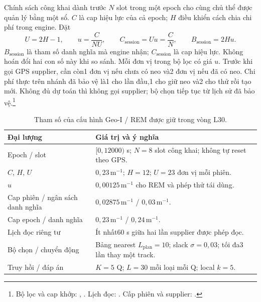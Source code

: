Chính sách công khai dành trước $N$ slot trong một epoch cho cùng chủ thể được quản lý bằng một sổ. $C$ là cap hiệu lực của cả epoch; $H$ điều khiển cách chia chi phí trong engine. Đặt
\begin{equation}
 U=2H-1,\qquad u=\frac{C}{N U},\qquad
 C_{\mathrm{session}}=Uu=\frac{C}{N},\qquad
 B_{\mathrm{session}}=2Hu.
 \label{eq:current-budget}
\end{equation}
$B_{\mathrm{session}}$ là tham số danh nghĩa mà engine nhận; $C_{\mathrm{session}}$ là cap hiệu lực. Không hoán đổi hai con số này khi so sánh. Mỗi đơn vị trong bộ lọc có giá $u$. Trước khi gọi GPS supplier, cần còn1 đơn vị nếu chưa có neo và2 đơn vị nếu đã có neo. Chi phí thực trên nhánh đã bảo vệ là1 cho lần đầu,1 cho giữ neo và2 cho thử rồi tạo mới. Không đủ dự toán thì không gọi supplier; bộ chọn tiếp tục từ lịch sử đã bảo vệ.\footnote{Bộ lọc và cap khớp: , . Lịch đọc: . Cấp phiên và supplier: .}

\begin{table}[htbp]\centering\small
\caption{Tham số của cấu hình Geo-I / REM được giữ trong vòng L30.}
\label{tab:current-method-config}
\begin{tabularx}{\textwidth}{P{4.6cm}Y}\toprule
Đại lượng & Giá trị và ý nghĩa\\\midrule
Epoch / slot & $[0,12000)$ s; $N=8$ slot công khai; không tự reset theo GPS.\\
$C$, $H$, $U$ & $0{,}23\,\mathrm m^{-1}$; $H=12$; $U=23$ đơn vị mỗi phiên.\\
$u$ & $0{,}00125\,\mathrm m^{-1}$ cho REM và phép thử tái dùng.\\
Cap phiên / ngân sách danh nghĩa & $0{,}02875\,\mathrm m^{-1}$ / $0{,}03\,\mathrm m^{-1}$.\\
Cap epoch / danh nghĩa & $0{,}23\,\mathrm m^{-1}$ / $0{,}24\,\mathrm m^{-1}$.\\
Lịch đọc riêng tư & Ít nhất60 s giữa hai lần supplier được phép đọc.\\
Bộ chọn / chuyển động & Bảng nearest $L_{\mathrm{plan}}=10$; slack $\sigma=0{,}03$; tối đa3 lần thay một track.\\
Truy hồi / đáp án & $K=5$ Q; $L=30$ mỗi loại mỗi Q; local $k=5$.\\\bottomrule
\end{tabularx}
\end{table}

